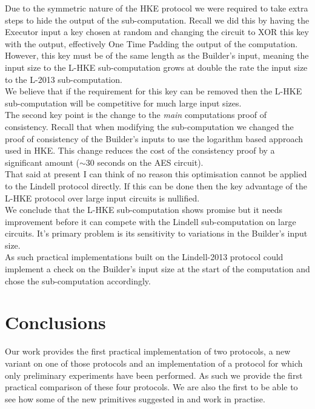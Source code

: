 \documentclass[ %
                    author={Nicholas Tutte},
                supervisor={Prof. Nigel Smart},
                    degree={MEng},
                     title={Secure Two Party Computation},
                  subtitle={A practical comparison of recent protocols},
                      type={Research - GG1K},
                      year={2015} ]{dissertation}
\begin{document}
						Due to the symmetric nature of the HKE protocol we were required to take extra steps to hide the output of the sub-computation. Recall we did this by having the Executor input a key chosen at random and changing the circuit to XOR this key with the output, effectively One Time Padding the output of the computation.\\ However, this key must be of the same length as the Builder's input, meaning the input size to the L-HKE sub-computation grows at double the rate the input size to the L-2013 sub-computation.\\

						We believe that if the requirement for this key can be removed then the L-HKE sub-computation will be competitive for much large input sizes.\\

						The second key point is the change to the \emph{main} computations proof of consistency. Recall that when modifying the sub-computation we changed the proof of consistency of the Builder's inputs to use the logarithm based approach used in HKE. This change reduces the cost of the consistency proof by a significant amount ($\sim 30$ seconds on the AES circuit).\\

						That said at present I can think of no reason this optimisation cannot be applied to the Lindell protocol directly. If this can be done then the key advantage of the L-HKE protocol over large input circuits is nullified.\\

						We conclude that the L-HKE sub-computation shows promise but it needs improvement before it can compete with the Lindell sub-computation on large circuits. It's primary problem is its sensitivity to variations in the Builder's input size.\\

						As such practical implementations built on the Lindell-2013 protocol could implement a check on the Builder's input size at the start of the computation and chose the sub-computation accordingly.


	\chapter{Conclusions}
		Our work provides the first practical implementation of two protocols, a new variant on one of those protocols and an implementation of a protocol for which only preliminary experiments have been performed. As such we provide the first practical comparison of these four protocols. We are also the first to be able to see how some of the new primitives suggested in \cite{LindellAndPinkas2011} and \cite{Lindell_CnC_2013} work in practise.\\
\end{document}
